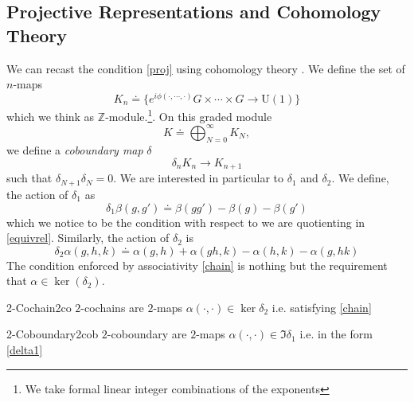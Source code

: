 \documentclass[11pt]{article}
\theoremstyle{definition}
\numberwithin{equation}{section}
\newcommand*\U{\mathrm{U}}
\begin{document}
\subsection{Projective Representations and Cohomology Theory}
We can recast the condition \eqref{proj} using cohomology theory \cite{Tachikawa2017gyf}. We define the set of $n$-maps
\begin{equation}
    K_n \doteq \{e^{i\phi(\cdot, \cdots, \cdot)} G \times \cdots \times G \to \U(1)\}
\end{equation} 
which we think as $\mathbb{Z}$-module.\footnote{We take formal linear integer combinations of the exponents}. On this graded module 
\begin{equation}
	K \doteq \bigoplus_{N=0}^{\infty} K_N,
\end{equation}
we define a \textit{coboundary map} $\delta$
\begin{equation}
    \delta_n  K_n \to K_{n+1}
\end{equation}
such that $\delta_{N+1}  \delta_N = 0$. We are interested in particular to $\delta_1$ and $\delta_2$. We define, the action of $\delta_1$ as
\begin{equation}\label{delta1}
    \delta_1 \beta(g,g') \doteq \beta(gg') -\beta(g) -\beta(g')
\end{equation}
which we notice to be the condition with respect to we are quotienting in \eqref{equivrel}. Similarly, the action of $\delta_2$ is
\begin{equation}
    \delta_2 \alpha(g,h,k) \doteq \alpha(g,h) + \alpha(gh,k) - \alpha(h,k) -\alpha(g,hk)
\end{equation}
The condition enforced by associativity \eqref{chain} is nothing but the requirement that $\alpha \in \ker(\delta_2)$. 

\begin{defn}{2-Cochain}{2co}
	$2$-cochains are $2$-maps $\alpha(\cdot, \cdot) \in \ker \delta_2$ i.e. satisfying \eqref{chain} 
\end{defn}
\begin{defn}{2-Coboundary}{2cob}
	$2$-coboundary are $2$-maps $\alpha(\cdot, \cdot) \in \Im \delta_1$ i.e. in the form \eqref{delta1}\\
\end{defn}
\end{document}
